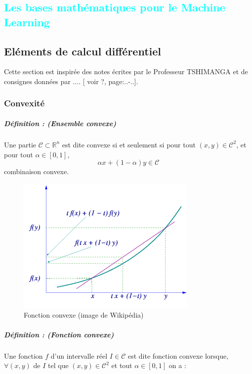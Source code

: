 
%
%

\textcolor{cyan}{\chapter{Les bases mathématiques pour le Machine Learning}}
	\section{Eléments de calcul différentiel}
	Cette section est inspirée des notes écrites par le Professeur TSHIMANGA \cite[voir][page:45-82]{jtshiman:2021} et de consignes données
	par .... [ voir ?, page:..-..].
	\subsection{Convexité}
		\paragraph*{Définition : (Ensemble convexe)} 
		Une partie $\mathcal{C} \subset \mathbb{R}^n $ est dite convexe si et seulement si pour tout $(x,y) \in \mathcal{C}^2$, 
		et pour tout $ \alpha \in [0, 1]$,
		$$ \alpha x + (1 - \alpha)y \in \mathcal{C}$$ combinaison convexe.
		\begin{figure}
			\centering
			\includegraphics{images/convex_function_graph.png}
			\caption{Fonction convexe (image de Wikipédia)}
			\label{convexe_graph}
		\end{figure}
		\paragraph*{Définition : (Fonction convexe)}
		Une fonction $f$ d'un intervalle réel $I \in \mathcal{C}$ est dite fonction convexe lorsque, $\forall (x,y)$ de $I$ tel que $(x,y) \in \mathcal{C}^2$ et tout $\alpha \in [0, 1]$ on a :
		
